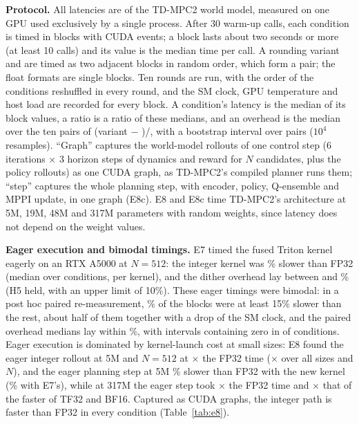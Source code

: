 \textbf{Protocol.} All latencies are of the TD-MPC2 world model, measured on one GPU used exclusively by a single process. After 30 warm-up calls, each condition is timed in blocks with CUDA events; a block lasts about two seconds or more (at least 10 calls) and its value is the median time per call. A rounding variant and \dtm are timed as two adjacent blocks in random order, which form a pair; the float formats are single blocks. Ten rounds are run, with the order of the conditions reshuffled in every round, and the SM clock, GPU temperature and host load are recorded for every block. A condition's latency is the median of its block values, a ratio is a ratio of these medians, and an overhead is the median over the ten pairs of (variant $-$ \dtm)/\dtm, with a bootstrap interval over pairs ($10^4$ resamples). ``Graph'' captures the world-model rollouts of one control step (6 iterations $\times$ 3 horizon steps of dynamics and reward for $N$ candidates, plus the policy rollouts) as one CUDA graph, as TD-MPC2's compiled planner runs them; ``step'' captures the whole planning step, with encoder, policy, Q-ensemble and MPPI update, in one graph (E8c). E8 and E8c time TD-MPC2's architecture at 5M, 19M, 48M and 317M parameters with random weights, since latency does not depend on the weight values.

\textbf{Eager execution and bimodal timings.} E7 timed the fused Triton kernel eagerly on an RTX A5000 at $N=512$: the integer kernel was \% slower than FP32 (median over conditions, per kernel), and the dither overhead lay between  and \% (H5 held, with an upper limit of 10\%). These eager timings were bimodal: in a post hoc paired re-measurement, \% of the blocks were at least 15\% slower than the rest, about half of them together with a drop of the SM clock, and the paired overhead medians lay within \%, with intervals containing zero in  of  conditions. Eager execution is dominated by kernel-launch cost at small sizes: E8 found the eager integer rollout at 5M and $N=512$ at $\times$ the FP32 time ($\times$ over all sizes and $N$), and the eager planning step at 5M \% slower than FP32 with the new kernel (\% with E7's), while at 317M the eager step took $\times$ the FP32 time and $\times$ that of the faster of TF32 and BF16. Captured as CUDA graphs, the integer path is faster than FP32 in every condition (Table~\ref{tab:e8}).


